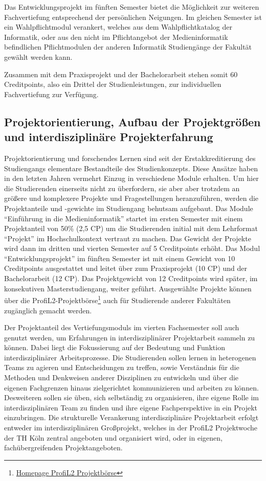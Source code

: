 Das Entwicklungsprojekt im fünften Semester bietet die Möglichkeit zur
weiteren Fachvertiefung entsprechend der persönlichen Neigungen. Im
gleichen Semester ist ein Wahlpflichtmodul verankert, welches aus dem
Wahlpflichtkatalog der Informatik, oder aus den nicht im Pflichtangebot
der Medieninformatik befindlichen Pflichtmodulen der anderen Informatik
Studiengänge der Fakultät gewählt werden kann.

Zusammen mit dem Praxisprojekt und der Bachelorarbeit stehen somit 60
Creditpoints, also ein Drittel der Studienleistungen, zur individuellen
Fachvertiefung zur Verfügung.

\subsection{Projektorientierung, Aufbau der Projektgrößen und
interdisziplinäre
Projekterfahrung}\label{projektorientierung-aufbau-der-projektgruxf6uxdfen-und-interdisziplinuxe4re-projekterfahrung}

Projektorientierung und forschendes Lernen sind seit der
Erstakkreditierung des Studiengangs elementare Bestandteile des
Studienkonzepts. Diese Ansätze haben in den letzten Jahren vermehrt
Einzug in verschiedene Module erhalten. Um hier die Studierenden
einerseits nicht zu überfordern, sie aber aber trotzdem an größere und
komplexere Projekte und Fragestellungen heranzuführen, werden die
Projektanteile und -gewichte im Studiengang behutsam aufgebaut. Das
Module ``Einführung in die Medieninformatik'' startet im ersten Semester
mit einem Projektanteil von 50\% (2,5 CP) um die Studierenden initial
mit dem Lehrformat ``Projekt'' im Hochschulkontext vertraut zu machen.
Das Gewicht der Projekte wird dann im dritten und vierten Semester auf 5
Creditpoints erhöht. Das Modul ``Entwicklungsprojekt'' im fünften
Semester ist mit einem Gewicht von 10 Creditpoints ausgestattet und
leitet über zum Praxisprojekt (10 CP) und der Bachelorarbeit (12 CP).
Das Projektgewicht von 12 Creditpoints wird später, im konsekutiven
Masterstudiengang, weiter geführt. Ausgewählte Projekte können über die
ProfiL2-Projektbörse\footnote{\href{http://projektboerse-profil2.th-koeln.de/}{Homepage
  ProfiL2 Projektbörse}} auch für Studierende anderer Fakultäten
zugänglich gemacht werden.

Der Projektanteil des Vertiefungsmoduls im vierten Fachsemester soll
auch genutzt werden, um Erfahrungen in interdisziplinärer Projektarbeit
sammeln zu können. Dabei liegt die Fokussierung auf der Bedeutung und
Funktion interdisziplinärer Arbeitsprozesse. Die Studierenden sollen
lernen in heterogenen Teams zu agieren und Entscheidungen zu treffen,
sowie Verständnis für die Methoden und Denkweisen anderer Disziplinen zu
entwickeln und über die eigenen Fachgrenzen hinaus zielgerichtet
kommunizieren und arbeiten zu können. Desweiteren sollen sie üben, sich
selbständig zu organisieren, ihre eigene Rolle im interdisziplinären
Team zu finden und ihre eigene Fachperspektive in ein Projekt
einzubringen. Die strukturelle Verankerung interdisziplinäre
Projektarbeit erfolgt entweder im interdisziplinären Großprojekt,
welches in der ProfiL2 Projektwoche der TH Köln zentral angeboten und
organisiert wird, oder in eigenen, fachübergreifenden Projektangeboten.

